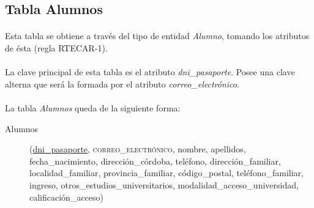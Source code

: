    \subsection{Tabla Alumnos}

      \paragraph{}Esta tabla se obtiene a través del tipo de entidad
      \textit{Alumno}, tomando los atributos de ésta (regla
      RTECAR-1).

      \paragraph{}La clave principal de esta tabla es el atributo
      \textit{dni\_pasaporte}. Posee una clave alterna que será la formada por
      el atributo \textit{correo\_electrónico}.

      \paragraph{}La tabla \textit{Alumnos} queda de la siguiente forma:

      \begin{description}
         \item[Alumnos] \begin{flushleft}(\underline{dni\_pasaporte},
         \textsc{correo\_electrónico}, nombre, apellidos, fecha\_nacimiento,
         dirección\_córdoba, teléfono, dirección\_familiar, localidad\_familiar,
         provincia\_familiar, código\_postal, teléfono\_familiar, ingreso,
         otros\_estudios\_universitarios, modalidad\_acceso\_universidad,
         calificación\_acceso)\end{flushleft}
      \end{description}
